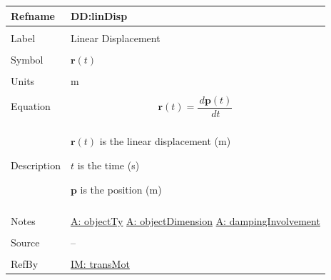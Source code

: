 \documentclass[12pt]{article}
\begin{document}
\noindent \begin{minipage}{\textwidth}
\begin{tabular}{>{\raggedright}p{}>{\raggedright\arraybackslash}p{}}
\toprule \textbf{Refname} & \textbf{DD:linDisp}
\label{DD:linDisp}
\\ \midrule \\
Label & Linear Displacement
\\ \midrule \\
Symbol & $\mathbf{r}(t)$
\\ \midrule \\
Units & m
\\ \midrule \\
Equation & \begin{displaymath}
           \mathbf{r}(t)=\frac{\,d\mathbf{p}\left(t\right)}{\,dt}
           \end{displaymath}
\\ \midrule \\
Description & \begin{symbDescription}
              \item{$\mathbf{r}(t)$ is the linear displacement (m)}
              \item{$t$ is the time (s)}
              \item{$\mathbf{p}$ is the position (m)}
              \end{symbDescription}
\\ \midrule \\
Notes & \hyperref[assumpOT]{A: objectTy}
        \hyperref[assumpOD]{A: objectDimension}
        \hyperref[assumpDI]{A: dampingInvolvement}
\\ \midrule \\
Source & --
\\ \midrule \\
RefBy & \hyperref[IM:transMot]{IM: transMot}
\\ \bottomrule
\end{tabular}
\end{minipage}
\par~
\end{document}
